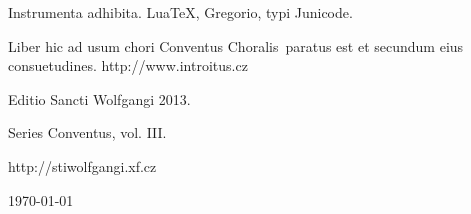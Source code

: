 \documentclass[a4paper, twoside, 12pt]{article}
\newcommand{\annusEditionis}{2013}
\begin{document}
Instrumenta adhibita.
LuaTeX, %
Gregorio, %
typi Junicode. %

\begin{center}
Liber hic ad usum chori 
\guillemotright Conventus Choralis\guillemotleft\ 
paratus est
et secundum eius consuetudines.
http://www.introitus.cz

\vspace{1cm}

{\large Editio Sancti Wolfgangi \annusEditionis .}

\vspace{2mm}

Series \guillemotright Conventus\guillemotleft, vol. III.

\vspace{1cm}

http://stiwolfgangi.xf.cz
\vfill

\today

\end{center}
\end{document}
